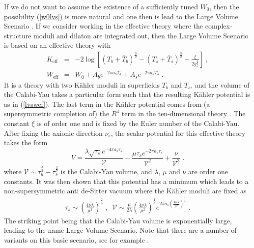 \documentclass[11pt,a4paper]{article}
\numberwithin{equation}{section}
\numberwithin{table}{section}\setlength{\multlinegap}{25pt}
\newcommand{\bea}{\begin{eqnarray}}  \newcommand{\eea}{\end{eqnarray}}
\newcommand{\nn}{\nonumber}
\newcommand{\cV}{\mathcal{V}}
\newcommand{\be}{\begin{equation}}
\newcommand{\ee}{\end{equation}}
\begin{document}
If we do not want to assume the existence of a sufficiently tuned $W_0$, then the possibility (\ref{w0lvs}) is more natural and one then is lead to the Large Volume Scenario \cite{Balasubramanian:2005zx}. If we consider working in the effective theory where the complex-structure moduli and dilaton are integrated out, then the Large Volume Scenario is based on an effective theory with
\bea
\label{lvswef}
K _{\mathrm{eff}} &=&  -2 \log \left[ \left(T_b + \overline{T}_b  \right)^{\frac32} - \left(T_s + \overline{T}_s  \right)^{\frac32} + \frac{\xi}{2g_s^{\frac32}} \right] \;, \nn \\
W_{\mathrm{eff}} &=& W_0 + A_b e^{-2\pi a_b T_b} + A_s e^{-2\pi a_s T_s} \;.
\eea
It is a theory with two K{\"a}hler moduli in superfields $T_b$ and $T_s$, and the volume of the Calabi-Yau takes a particular form such that the resulting K{\"a}hler potential is as in (\ref{lvswef}).
The last  term in the K{\"a}hler potential comes from (a supersymmetric completion of) the $R^4$ term in the ten-dimensional theory \cite{Becker:2002nn}. The constant $\xi$ is of order one and is fixed by the Euler number of the Calabi-Yau. After fixing the axionic direction $\nu_s$, the scalar potential for this effective theory takes the form \cite{Balasubramanian:2005zx}
\be
\label{lvssp}
V = \frac{\lambda \sqrt{\tau_s}e^{-4\pi a_s \tau_s}}{\cV} - \frac{\mu\tau_s e^{-2\pi a_s \tau_s}}{\cV^2} + \frac{\nu}{\cV^3} \;.
\ee
where $\cV \sim \tau_b^{\frac32} - \tau_s^{\frac32}$ is the Calabi-Yau volume, and $\lambda$, $\mu$ and $\nu$ are order one constants. It was then shown that this potential has a minimum which leads to a non-supersymmetric anti de-Sitter vacuum where the K{\"a}hler moduli are fixed as
\bea
\label{lvsm}
\tau_s \sim \left(\frac{4 \nu \lambda}{\mu^2} \right)^{\frac23} \;,\;\; \cV \sim \frac{\mu}{2\lambda}  \left(\frac{4 \nu \lambda}{\mu^2} \right)^{\frac13} e^{2\pi a_s  \left(\frac{4 \nu \lambda}{\mu^2} \right)^{\frac23}}\;.
\eea
The striking point being that the Calabi-Yau volume is exponentially large, leading to the name Large Volume Scenario. 
Note that there are a number of variants on this basic scenario, see for example \cite{Cicoli:2008va}. 
\end{document}

